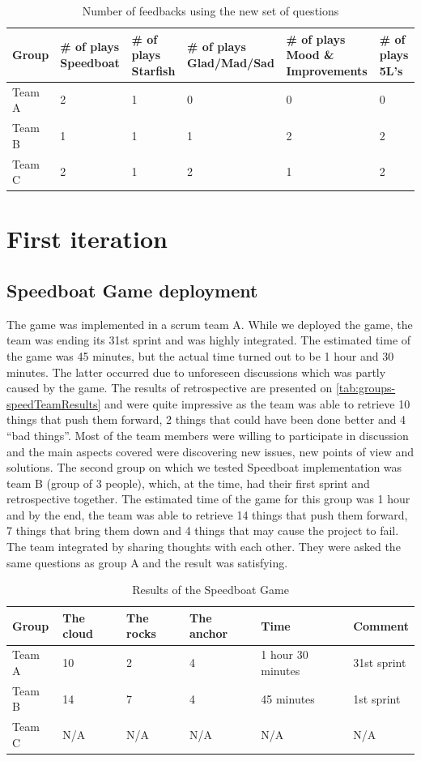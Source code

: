 \begin{table}[!htbp]
	\caption{Number of feedbacks using the new set of questions}
	\label{tab:groups-nPlaysNewSet}
	\begin{tabularx}{\textwidth}{|X|X|X|X|X|X|}
	\hline
		Group & \# of plays Speedboat & \# of plays Starfish & \# of plays Glad/Mad/Sad & \# of plays Mood \& Improvements & \# of plays 5L's \\ \hline
		Team A & 2 & 1 & 0 & 0 & 0 \\ \hline
		Team B & 1 & 1 & 1 & 2 & 2\\ \hline
        Team C & 2 & 1 & 2 & 1 & 2 \\ \hline
	\end{tabularx}
\end{table}

\section{First iteration}
\label{sec:firstIt}
\subsection{Speedboat Game deployment}
The game was implemented in a scrum team A. While we deployed the game, the team was ending its 31st sprint and was highly integrated. The estimated time of the game was 45 minutes, but the actual time turned out to be 1 hour and 30 minutes. The latter occurred due to unforeseen discussions which was partly caused by the game. The results of retrospective are presented on \autoref{tab:groups-speedTeamResults} and were quite impressive as the team was able to retrieve 10 things that push them forward, 2 things that could have been done better and 4 “bad things”. Most of the team members were willing to participate in discussion and the main aspects covered were discovering new issues, new points of view and solutions.
The second group on which we tested Speedboat implementation was team B (group of 3 people), which, at the time, had their first sprint and retrospective together. The estimated time of the game for this group was 1 hour and by the end, the team was able to retrieve 14 things that push them forward, 7 things that bring them down and 4 things that may cause the project to fail. The team integrated by sharing thoughts with each other. They were asked the same questions as group A and the result was satisfying. 

\begin{table}[!htbp]
	\caption{Results of the Speedboat Game}
	\label{tab:groups-speedTeamResults}
	\begin{tabularx}{\textwidth}{|X|X|X|X|X|X|}
	\hline
		Group & The cloud & The rocks & The anchor & Time & Comment\\ \hline
		Team A & 10 & 2 & 4 & 1 hour 30 minutes & 31st sprint \\ \hline
		Team B & 14 & 7 & 4 & 45 minutes & 1st sprint\\ \hline
        Team C & N/A & N/A & N/A & N/A & N/A\\ \hline
	\end{tabularx}
\end{table}


